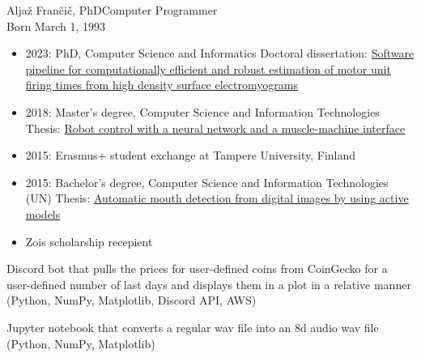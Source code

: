\documentclass{article}
\begin{document}
\begin{cv}[avatar]{Aljaž Frančič, PhD}{Computer Programmer\\\small{Born March 1, 1993}}
\begin{cvevent}[2012][2023]
    \begin{itemize}
        \item 2023: PhD, Computer Science and Informatics \newline
            Doctoral dissertation: \href{https://dk.um.si/IzpisGradiva.php?id=84908}{Software pipeline for computationally efficient and robust estimation of motor unit firing times from high density surface electromyograms}
        \item 2018: Master’s degree, Computer Science and Information Technologies \newline
            Thesis: \href{https://dk.um.si/IzpisGradiva.php?id=71712}{Robot control with a neural network and a muscle-machine interface}
        \item 2015: Erasmus+ student exchange at Tampere University, Finland
        \item 2015: Bachelor’s degree, Computer Science and Information Technologies (UN) \newline
            Thesis: \href{https://dk.um.si/IzpisGradiva.php?id=48527}{Automatic mouth detection from digital images by using active models}
    \end{itemize}
\end{cvevent}

\begin{cvevent}[2008][2012]
        \begin{itemize}
            \item Zois scholarship recepient
        \end{itemize}
\end{cvevent}



\begin{cvevent}
    Discord bot that pulls the prices for user-defined coins from CoinGecko for a user-defined number of last days and displays them in a plot in a relative manner (Python, NumPy, Matplotlib, Discord API, AWS)
\end{cvevent}

\cvseparator[2]
\begin{cvevent}
    Jupyter notebook that converts a regular wav file into an 8d audio wav file (Python, NumPy, Matplotlib)


\end{cvevent}
\end{cv}
\end{document}
